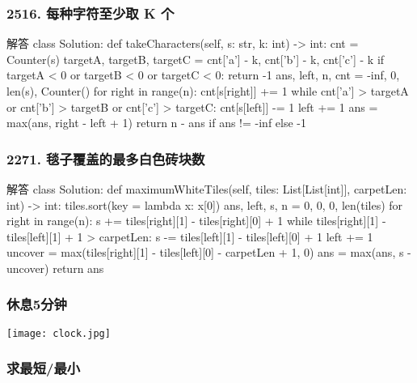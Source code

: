\begin{frame}[fragile]          %
  \frametitle{\textsc{2516. 每种字符至少取 K 个}}
  \begin{codeblock}[language=python]{解答}
class Solution:
  def takeCharacters(self, s: str, k: int) -> int:
    cnt = Counter(s)
    targetA, targetB, targetC = cnt['a'] - k, cnt['b'] - k, cnt['c'] - k
    if targetA < 0 or targetB < 0 or targetC < 0:
        return -1
    ans, left, n, cnt = -inf, 0, len(s), Counter()
    for right in range(n):
        cnt[s[right]] += 1
        while cnt['a'] > targetA or cnt['b'] > targetB or cnt['c'] > targetC:
            cnt[s[left]] -= 1
            left += 1
        ans = max(ans, right - left + 1)
    return n - ans if ans != -inf else -1
  \end{codeblock}
\end{frame}


\begin{frame}[fragile]          %
  \frametitle{\textsc{2271. 毯子覆盖的最多白色砖块数}}
  \begin{codeblock}[language=python]{解答}
class Solution:
  def maximumWhiteTiles(self, tiles: List[List[int]], carpetLen: int) -> int:
    tiles.sort(key = lambda x: x[0])
    ans, left, s, n = 0, 0, 0, len(tiles)
    for right in range(n):
        s += tiles[right][1] - tiles[right][0] + 1
        while tiles[right][1] - tiles[left][1] + 1 > carpetLen:
            s -= tiles[left][1] - tiles[left][0] + 1
            left += 1
        uncover = max(tiles[right][1] - tiles[left][0] - carpetLen + 1, 0)
        ans = max(ans, s - uncover)
    return ans
  \end{codeblock}
\end{frame}

\begin{frame}
  \frametitle{\centering 休息5分钟}
  \begin{center}
    \texttt{[image: clock.jpg]} %
  \end{center}
  \printbibliography[heading=none]
\end{frame}

\subsubsection{求最短/最小}

